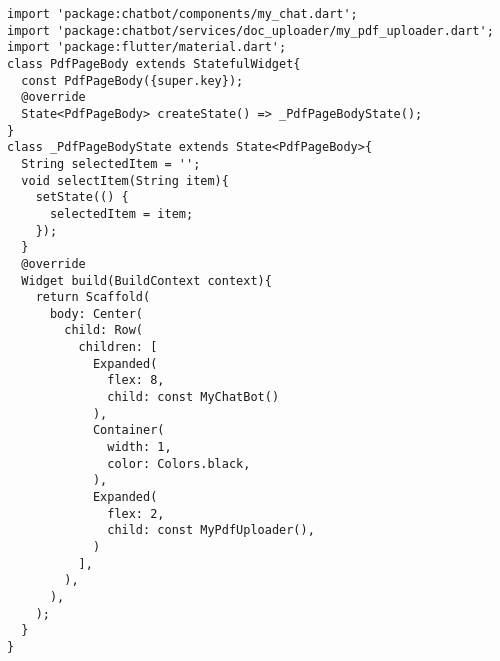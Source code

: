 \begin{lstlisting}[style=pythonstyle,caption={Codice del pdf\_page\_body.dart}, label={lst:pdfpagebody}]
import 'package:chatbot/components/my_chat.dart';
import 'package:chatbot/services/doc_uploader/my_pdf_uploader.dart';
import 'package:flutter/material.dart';
class PdfPageBody extends StatefulWidget{
  const PdfPageBody({super.key});
  @override
  State<PdfPageBody> createState() => _PdfPageBodyState();
}
class _PdfPageBodyState extends State<PdfPageBody>{
  String selectedItem = '';
  void selectItem(String item){
    setState(() {
      selectedItem = item;
    });
  }
  @override
  Widget build(BuildContext context){
    return Scaffold(
      body: Center(
        child: Row(
          children: [
            Expanded(
              flex: 8,
              child: const MyChatBot()
            ),
            Container(
              width: 1,
              color: Colors.black,
            ),
            Expanded(
              flex: 2,
              child: const MyPdfUploader(),
            )
          ],
        ),
      ),
    );
  }
}
\end{lstlisting}
